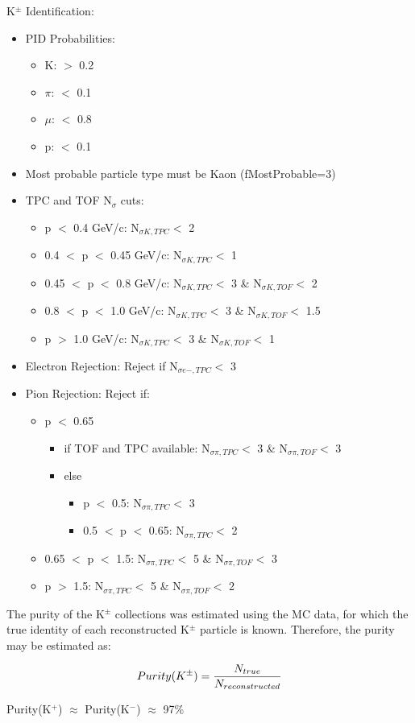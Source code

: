 \documentclass[../AnalysisNoteJBuxton.tex]{subfiles}
\begin{document}
 K$^{\pm}$ Identification:
 \begin{itemize} 
  \item PID Probabilities:
  \begin{itemize}
   \itemsep0em
   \item K: $>$ 0.2  
   \item $\pi$: $<$ 0.1 
   \item $\mu$: $<$ 0.8
   \item p: $<$ 0.1
  \end{itemize}
  \item Most probable particle type must be Kaon (fMostProbable=3)
  \item TPC and TOF N$_{\sigma}$ cuts:
  \begin{itemize}
   \itemsep0em
   \item p $<$ 0.4 GeV/c: N$_{\sigma K,TPC} <$ 2
   \item 0.4 $<$ p $<$ 0.45 GeV/c: N$_{\sigma K,TPC} <$ 1
   \item 0.45 $<$ p $<$ 0.8 GeV/c: N$_{\sigma K,TPC} <$ 3 \& N$_{\sigma K,TOF} <$ 2
   \item 0.8 $<$ p $<$ 1.0 GeV/c: N$_{\sigma K,TPC} <$ 3 \& N$_{\sigma K,TOF} <$ 1.5
   \item p $>$ 1.0 GeV/c: N$_{\sigma K,TPC} <$ 3 \& N$_{\sigma K,TOF} <$ 1    
  \end{itemize}
  \item Electron Rejection: Reject if N$_{\sigma e-,TPC} < $ 3
  \item Pion Rejection:  Reject if: 
  \begin{itemize}
   \itemsep0em
   \item p $<$ 0.65
   \begin{itemize}
    \itemsep0em
    \item if TOF and TPC available: N$_{\sigma \pi,TPC} <$ 3 \& N$_{\sigma \pi,TOF} <$ 3
    \item else
    \begin{itemize}
     \itemsep0em
     \item p $<$ 0.5: N$_{\sigma \pi,TPC} <$ 3
     \item 0.5 $<$ p $<$ 0.65: N$_{\sigma \pi,TPC} <$ 2
    \end{itemize}
   \end{itemize}
   \item 0.65 $<$ p $<$ 1.5: N$_{\sigma \pi,TPC} <$ 5 \& N$_{\sigma \pi,TOF} <$ 3
   \item p $>$ 1.5: N$_{\sigma \pi,TPC} <$ 5 \& N$_{\sigma \pi,TOF} <$ 2  
  \end{itemize} 
 \end{itemize}

The purity of the K$^{\pm}$ collections was estimated using the MC data, for which the true identity of each reconstructed K$^{\pm}$ particle is known.  Therefore, the purity may be estimated as:

\begin{equation}
 Purity(K^{\pm}) = \frac{N_{true}}{N_{reconstructed}} \\
\label{eqn:KchPurity}
\end{equation}

Purity(K$^{+}$) $\approx$ Purity(K$^{-}$) $\approx$ 97\%
\end{document}
